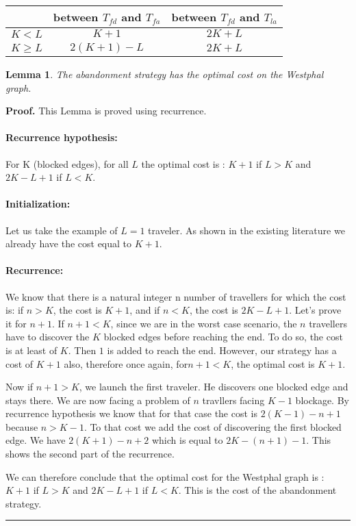 \documentclass[a4paper, 10pt]{article}
\newtheorem{lemma}{Lemma}
\newenvironment{proof}[1][Proof]{\textbf{#1.} }{\ \rule{0.5em}{0.5em}}
\begin{document}
\begin{center}
\begin{tabular}{|c|c|c|}
\hline
 & between $T_{fd}$ and $T_{fa}$  & between $T_{fd}$ and $ T_{la}$ \\ 
\hline
 ${K<L}$  & ${K + 1}$ & ${ 2K + L}$   \\ 
\hline
 ${K \geq L}$  & ${2(K+1) - L}$ & ${2K + L}$   \\ 
\hline
\end{tabular}
\end{center}

\begin{lemma} The abandonment strategy has the optimal cost on the Westphal graph.
\end{lemma}

\begin{proof} This Lemma is proved using recurrence.  

\paragraph{Recurrence hypothesis:} For K (blocked edges), for all $L$ the optimal cost is : $K + 1$ if $L > K$ and $2K - L + 1$ if $L < K$.

\paragraph{Initialization:} Let us take the example of $L = 1$ traveler. As shown in the existing literature we already have the cost equal to $K + 1$.

\paragraph{Recurrence:} We know that there is a natural integer n number of travellers for which the cost is: if $n > K$, the cost is $K + 1$, and if $n < K$, the cost is $2K - L + 1$. Let's prove it for $n + 1$. 
If $n + 1 < K$, since we are in the worst case scenario, the $n$ travellers have to discover the $K$ blocked edges before reaching the end. To do so, the cost is at least of $K$. Then $1$ is added to reach the end. However, our strategy has a cost of $K + 1$ also, therefore once again, for$ n + 1 < K$, the optimal cost is $K + 1$. 

Now if $n + 1 > K$, we launch the first traveler. He discovers one blocked edge and stays there. We are now facing a problem of $n$ travllers facing $K-1$ blockage. By recurrence hypothesis we know that for that case the cost is $2(K-1) - n + 1$ because $n > K - 1$. To that cost we add the cost of discovering the first blocked edge. We have $2(K + 1) - n + 2$ which is equal to $2K - (n + 1) - 1$. This shows the second part of the recurrence.

We can therefore conclude that the optimal cost for the Westphal graph is : $K + 1$ if $L > K$ and $2K - L + 1$ if $L < K$. This is the cost of the abandonment strategy. 
\end{proof}
\end{document}
